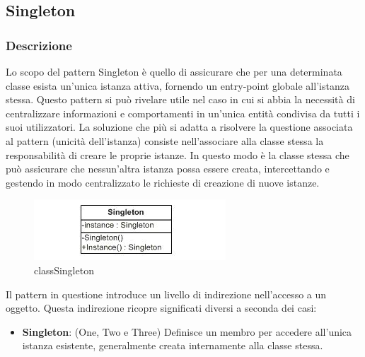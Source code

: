 \documentclass[a4paper,10pt]{article}
\begin{document}
                \subsection{Singleton}
                \subsubsection{Descrizione}
        


                Lo scopo del pattern Singleton è quello di assicurare che per una determinata classe esista un’unica istanza attiva, fornendo un entry-point globale all’istanza stessa. Questo pattern si può rivelare utile nel caso in cui si abbia la necessità di centralizzare informazioni e comportamenti in un’unica entità condivisa da tutti i suoi utilizzatori. La soluzione che più si adatta a risolvere la questione associata al pattern (unicità dell’istanza) consiste nell’associare alla classe stessa la responsabilità di creare le proprie istanze. In questo modo è la classe stessa che può assicurare che nessun’altra istanza possa essere creata, intercettando e gestendo in modo centralizzato le richieste di creazione di nuove istanze.    
                \begin{figure}[h!] %
                    \centering
                    \includegraphics[scale=1]{img/IC18161}
                    \caption{classSingleton}
                \end{figure}
    
                Il pattern in questione introduce un livello di indirezione nell’accesso a un oggetto. Questa indirezione ricopre significati diversi a seconda dei casi:
                        
                \begin{itemize}
                    \item \textbf{Singleton}: (One, Two e Three) Definisce un membro per accedere all’unica istanza esistente, generalmente creata internamente alla classe stessa.
                    
                \end{itemize}
                
\end{document}
